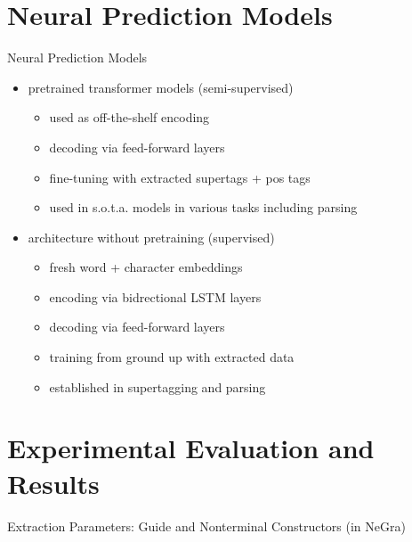 \documentclass[aspectratio=169, 10pt]{beamer}
\begin{document}
    \section{Neural Prediction Models}
    \begin{frame}{Neural Prediction Models}
            \begin{itemize}
                \item<+-> pretrained transformer models \citep{vaswani2017attention, Devlin2019} (semi-supervised)
                \begin{itemize}
                    \item used as off-the-shelf encoding
                    \item decoding via feed-forward layers
                    \item fine-tuning with extracted supertags + pos tags
                    \item used in s.o.t.a. models in various tasks including parsing \citep{Cor20, FerGom20a, FerGom22,Coa21, Sun22}
                \end{itemize}
                \item<+-> architecture without pretraining (supervised)
                \begin{itemize}
                    \item fresh word + character embeddings
                    \item encoding via bidrectional LSTM \citep{Hoc97} layers
                    \item decoding via feed-forward layers
                    \item training from ground up with extracted data
                    \item established in supertagging and parsing \citep{vaswani2016supertagging, Cor20, StaSte20}
                \end{itemize}
            \end{itemize}
    \end{frame}


    \section{Experimental Evaluation and Results}
    \begin{frame}{Extraction Parameters: Guide and Nonterminal Constructors (in NeGra)}
        
    \end{frame}
\end{document}
